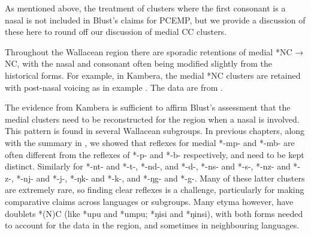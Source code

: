 As mentioned above,
the treatment of clusters where the first consonant is a nasal
is not included in Blust’s claims for PCEMP,
but we provide a discussion of these here to round off our discussion
of medial CC clusters.

Throughout the Wallacean region there are sporadic retentions
of medial *NC → NC,
with the nasal and consonant often being modified slightly from the historical forms.
For example, in Kambera,
the medial *NC clusters are retained with post-nasal voicing
as in example .
The data are from \citet[54]{Blust2008}.


The evidence from Kambera is sufficient to affirm Blust’s assessment
that the medial clusters need to be reconstructed for the region
when a nasal is involved.
This pattern is found in several Wallacean subgroups.
In previous chapters, along with the summary in ,
we showed that reflexes for medial *-mp-
and *-mb- are often different from the reflexes of *-p-
and *-b- respectively, and need to be kept distinct.
Similarly for *-nt- and *-t-, *-nd-,
and *-d-, *-ns- and *-s-, *-nz-
and *-z-, *-nj- and *-j-, *-ŋk-
and *-k-, and *-ŋg- and *-g-.
Many of these latter clusters are extremely rare,
so finding clear reflexes is a challenge,
particularly for making comparative claims across languages or subgroups.
Many etyma however, have doublets *(N)C (like *upu
and *umpu; *ŋisi and *ŋinsi), with both forms needed to account
for the data in the region,
and sometimes in neighbouring languages.

